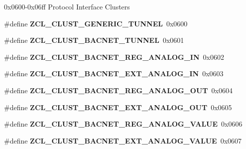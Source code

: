 \label{_amgrp01747264fe7bf50731df0522c351974e}%
0x0600-\/0x06ff Protocol Interface Clusters \begin{DoxyCompactItemize}
\item 
\mbox{\label{group__zcl_ga9ac47617e3db4ad44b22c890b6a5ab47}} 
\#define {\bfseries Z\+C\+L\+\_\+\+C\+L\+U\+S\+T\+\_\+\+G\+E\+N\+E\+R\+I\+C\+\_\+\+T\+U\+N\+N\+EL}~0x0600
\item 
\mbox{\label{group__zcl_ga8752b8b9d5c32c535a2bf24bd0f246f5}} 
\#define {\bfseries Z\+C\+L\+\_\+\+C\+L\+U\+S\+T\+\_\+\+B\+A\+C\+N\+E\+T\+\_\+\+T\+U\+N\+N\+EL}~0x0601
\item 
\mbox{\label{group__zcl_ga255eda08cdf2d37e7ee7d9c3171b1574}} 
\#define {\bfseries Z\+C\+L\+\_\+\+C\+L\+U\+S\+T\+\_\+\+B\+A\+C\+N\+E\+T\+\_\+\+R\+E\+G\+\_\+\+A\+N\+A\+L\+O\+G\+\_\+\+IN}~0x0602
\item 
\mbox{\label{group__zcl_ga67ff2d43a5736e28d48d67b883736cff}} 
\#define {\bfseries Z\+C\+L\+\_\+\+C\+L\+U\+S\+T\+\_\+\+B\+A\+C\+N\+E\+T\+\_\+\+E\+X\+T\+\_\+\+A\+N\+A\+L\+O\+G\+\_\+\+IN}~0x0603
\item 
\mbox{\label{group__zcl_gabbb40e815833de049b591db02737c642}} 
\#define {\bfseries Z\+C\+L\+\_\+\+C\+L\+U\+S\+T\+\_\+\+B\+A\+C\+N\+E\+T\+\_\+\+R\+E\+G\+\_\+\+A\+N\+A\+L\+O\+G\+\_\+\+O\+UT}~0x0604
\item 
\mbox{\label{group__zcl_ga8fea21ca7403db52e2ced5207e942584}} 
\#define {\bfseries Z\+C\+L\+\_\+\+C\+L\+U\+S\+T\+\_\+\+B\+A\+C\+N\+E\+T\+\_\+\+E\+X\+T\+\_\+\+A\+N\+A\+L\+O\+G\+\_\+\+O\+UT}~0x0605
\item 
\mbox{\label{group__zcl_gaf8eec7c3306e846d7a3bb1ac6fd79f94}} 
\#define {\bfseries Z\+C\+L\+\_\+\+C\+L\+U\+S\+T\+\_\+\+B\+A\+C\+N\+E\+T\+\_\+\+R\+E\+G\+\_\+\+A\+N\+A\+L\+O\+G\+\_\+\+V\+A\+L\+UE}~0x0606
\item 
\mbox{\label{group__zcl_ga141804cd31b8ae5223519b8c14a3c411}} 
\#define {\bfseries Z\+C\+L\+\_\+\+C\+L\+U\+S\+T\+\_\+\+B\+A\+C\+N\+E\+T\+\_\+\+E\+X\+T\+\_\+\+A\+N\+A\+L\+O\+G\+\_\+\+V\+A\+L\+UE}~0x0607
\item 
\mbox{\label{group__zcl_ga1656ef8cb0ffed118cc274fa7c8e8496}} 

\end{DoxyCompactItemize}
